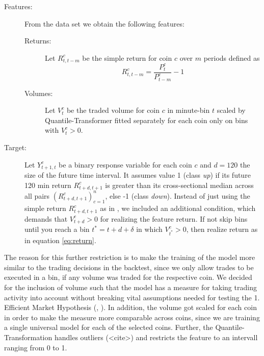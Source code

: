\begin{description}
    \item[Features:] From the data set we obtain the following features:
    \begin{description}
        \item[Returns:] Let $ R^{c}_{t, t - m} $ be the simple return for coin $ c $ over $ m $ periods defined as
        \begin{equation}
            \label{eq:return}
            R^{c}_{t, t - m} = \frac{ P^{c}_{t} }{ P^{c}_{t - m} } - 1 
        \end{equation} 
        \item[Volumes:] {
            Let $ V^{c}_{t} $ be the traded volume for coin $ c $ in minute-bin $ t $ scaled by Quantile-Transformer 
            fitted separately for each coin only on bins with $ V^{c}_{t} > 0 $. 
        }
    \end{description}
    \item[Target:] {
        Let $ Y^{c}_{t + 1, t} $ be a binary response variable for each coin $c$ 
        and $ d = 120 $ the size of the future time interval. 
        It assumes value 1 (class \textit{up}) if its future 120 min return $ R^{c}_{t + d, t + 1} $ is greater 
        than its cross-sectional median across all pairs $ ( R^{c}_{t + d, t + 1} )^{n}_{c=1} $, 
        else -1 (class \textit{down}). 
        Instead of just using the simple return $ R^{c}_{t + d, t + 1} $ as in \cite{krauss2019statisticalArbitrage},
        we included an additional condition, which demands that $  V^{c}_{t + d} > 0 $ for realizing the feature return.
        If not skip bins until you reach a bin $ t^{*} = t + d + \delta $  in which $  V^{c}_{ t^{*} } > 0 $, 
        then realize return as in equation \ref{eq:return}.
    }
\end{description}


The reason for this further restriction is to make the training of the model more similar to the 
trading decisions in the backtest, since we only allow trades to be executed in a bin, 
if any volume was traded for the respective coin.
We decided for the inclusion of volume such that the model has a measure for 
taking trading activity into account without breaking vital assumptions needed for testing 
the 1. Efficient Market Hypothesis (\cite{malkiel2003marketHypothesis}, \cite{fama1970marketHypothesis}).
In addition, the volume got scaled for each coin in order to make the measure more comparable across coins,
since we are training a single universal model for each of the selected coins. 
Further, the Quantile-Transformation handles outliers (<cite>) and restricts the feature to an intervall ranging from 0 to 1.

